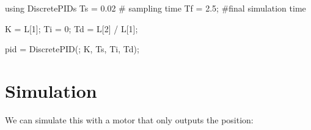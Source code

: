 \documentclass[
  8pt,
  a4paper,
]{book}
\newenvironment{Shaded}{\begin{snugshade}}{\end{snugshade}}
\newcommand{\BuiltInTok}[1]{\textcolor[rgb]{0.00,0.23,0.31}{#1}}
\newcommand{\CommentTok}[1]{\textcolor[rgb]{0.37,0.37,0.37}{#1}}
\newcommand{\FloatTok}[1]{\textcolor[rgb]{0.68,0.00,0.00}{#1}}
\newcommand{\FunctionTok}[1]{\textcolor[rgb]{0.28,0.35,0.67}{#1}}
\newcommand{\ImportTok}[1]{\textcolor[rgb]{0.00,0.46,0.62}{#1}}
\newcommand{\NormalTok}[1]{\textcolor[rgb]{0.00,0.23,0.31}{#1}}
\newcommand{\OperatorTok}[1]{\textcolor[rgb]{0.37,0.37,0.37}{#1}}
\begin{document}
\begin{Shaded}
\begin{Highlighting}[]
\ImportTok{using} \BuiltInTok{DiscretePIDs}
\NormalTok{Ts }\OperatorTok{=} \FloatTok{0.02} \CommentTok{\# sampling time}
\NormalTok{Tf }\OperatorTok{=} \FloatTok{2.5}\NormalTok{; }\CommentTok{\#final simulation time}

\NormalTok{K }\OperatorTok{=}\NormalTok{ L[}\FloatTok{1}\NormalTok{];}
\NormalTok{Ti }\OperatorTok{=} \FloatTok{0}\NormalTok{;}
\NormalTok{Td }\OperatorTok{=}\NormalTok{ L[}\FloatTok{2}\NormalTok{] }\OperatorTok{/}\NormalTok{ L[}\FloatTok{1}\NormalTok{];}

\NormalTok{pid }\OperatorTok{=} \FunctionTok{DiscretePID}\NormalTok{(; K, Ts, Ti, Td);}
\end{Highlighting}
\end{Shaded}

\section{Simulation}\label{simulation-2}

We can simulate this with a motor that only outputs the position:
\end{document}
